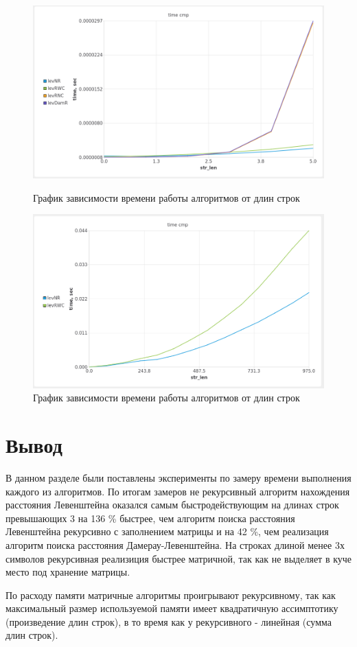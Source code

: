     \begin{figure}[h!]
        \centering
        \includegraphics[scale=0.7]{img/smallGraphic}
        \caption{График зависимости времени работы алгоритмов от длин строк}
        \label{fig:12}

        \includegraphics[scale=0.7]{img/LargeGraphic}
        \caption{График зависимости времени работы алгоритмов от длин строк}
        \label{fig:22}
    \end{figure}

    \section{Вывод}
        В данном разделе были поставлены эксперименты по замеру времени
        выполнения каждого из алгоритмов. По итогам замеров не рекурсивный 
        алгоритм нахождения расстояния Левенштейна оказался самым быстродействующим
        на длинах строк превышающих 3 на 136 \% быстрее, чем алгоритм поиска
        расстояния Левенштейна рекурсивно с заполнением матрицы и на 42 \%,
        чем реализация алгоритм поиска расстояния Дамерау-Левенштейна. На строках
        длиной менее 3х символов рекурсивная реализиция быстрее матричной, так
        как не выделяет в куче место под хранение матрицы.  
        
        По расходу памяти матричные алгоритмы проигрывают рекурсивному, так как
        максимальный размер используемой памяти имеет квадратичную ассимптотику
        (произведение длин строк), в то время как у рекурсивного - линейная (сумма длин строк).


\newpage